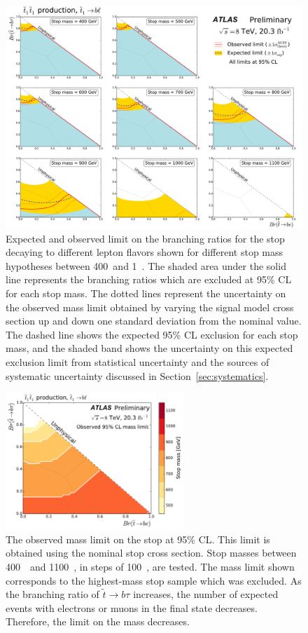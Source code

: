 \begin{figure}[ht]
  \centering
  \includegraphics[width=\textwidth]{figs/blstop/limit_contours.pdf}
  \caption{Expected and observed limit on the branching ratios for the stop
    decaying to different lepton flavors shown for different stop mass
    hypotheses between 400~\GeV and 1~\TeV. The shaded area under the solid
    line represents the branching ratios which are excluded at 95\% CL
    for each stop mass.
    The dotted lines represent the uncertainty on the observed mass limit
    obtained by varying the signal model cross section up and down one standard
    deviation from the nominal value. The dashed line shows the
    expected 95\% CL exclusion for each stop mass, and the shaded band shows
    the uncertainty on this expected exclusion limit from statistical
    uncertainty and the sources of systematic uncertainty discussed in
    Section~\ref{sec:systematics}.
  }
  \label{fig:limit_contours}
\end{figure}

\begin{figure}[ht]
  \centering
  \includegraphics[width=0.6\textwidth]{figs/blstop/mass_limit_contours_no_extras_obs.pdf}
  \caption{The observed mass limit on the stop at 95\% CL.
    This limit is obtained using the nominal stop cross section.
    Stop masses between 400~\GeV\ and 1100~\GeV, in steps of 100~\GeV, are
    tested. The mass limit shown corresponds to the highest-mass stop sample
    which was excluded.
    As the branching ratio of $\tilde{t} \rightarrow b\tau$ increases, the
    number of expected events with electrons or muons in the final state
    decreases. Therefore, the limit on the mass decreases.
  }
  \label{fig:mass_limit_obs}
\end{figure}

